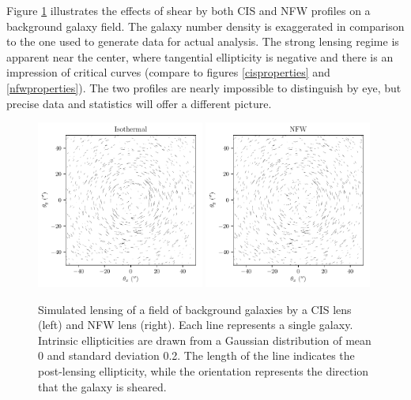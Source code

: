 \documentclass[10pt]{article}
\begin{document}
Figure \ref{ellipticityexample} illustrates the effects of shear by both CIS and NFW profiles on a background galaxy field. The galaxy number density is exaggerated in comparison to the one used to generate data for actual analysis. The strong lensing regime is apparent near the center, where tangential ellipticity is negative and there is an impression of critical curves (compare to figures \ref{cisproperties} and \ref{nfwproperties}). The two profiles are nearly impossible to distinguish by eye, but precise data and statistics will offer a different picture.

\begin{figure}
    \centering
    \includegraphics[width=0.49\textwidth]{isothermalellipticities.pdf}
    \includegraphics[width=0.49\textwidth]{nfwellipticities.pdf}
    \caption{Simulated lensing of a field of background galaxies by a CIS lens (left) and NFW lens (right). Each line represents a single galaxy. Intrinsic ellipticities are drawn from a Gaussian distribution of mean 0 and standard deviation 0.2. The length of the line indicates the post-lensing ellipticity, while the orientation represents the direction that the galaxy is sheared.}
    \label{ellipticityexample}
\end{figure}
\end{document}
